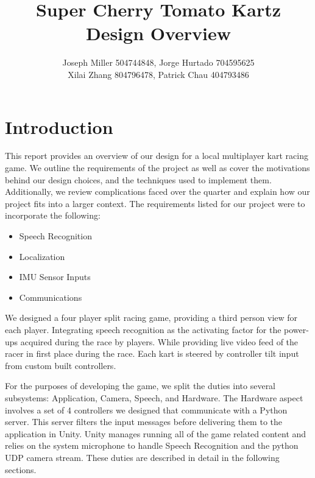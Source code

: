 \documentclass[a4paper,10pt]{article}
\begin{document}
%
   \title{Super Cherry Tomato Kartz Design Overview}

   \author{Joseph Miller 504744848, Jorge Hurtado 704595625 \\ Xilai Zhang 804796478, Patrick Chau 404793486}
          
   \date{}

   \maketitle
   
   \tableofcontents
 
  \newpage
   
\doublespacing

\section{Introduction}
This report provides an overview of our design for a local multiplayer kart racing game. We outline the requirements of the project as well as cover the motivations behind our design choices, and the techniques used to implement them. Additionally, we review complications faced over the quarter and explain how our project fits into a larger context. The requirements listed for our project were to incorporate the following: 

\singlespacing
\begin{itemize}
\item Speech Recognition
\item Localization
\item IMU Sensor Inputs
\item Communications
\end{itemize}

\doublespacing

\noindent
We designed a four player split racing game, providing a third person view for each player. Integrating speech recognition as the activating factor for the power-ups acquired during the race by players. While providing live video feed of the racer in first place during the race. Each kart is steered by controller tilt input from custom built controllers. 

For the purposes of developing the game, we split the duties into several subsystems: Application, Camera, Speech, and Hardware. The Hardware aspect involves a set of 4 controllers we designed that communicate with a Python server. This server filters the input messages before delivering them to the application in Unity. Unity manages running all of the game related content and relies on the system microphone to handle Speech Recognition and the python UDP camera stream. These duties are described in detail in the following sections.
\end{document}
